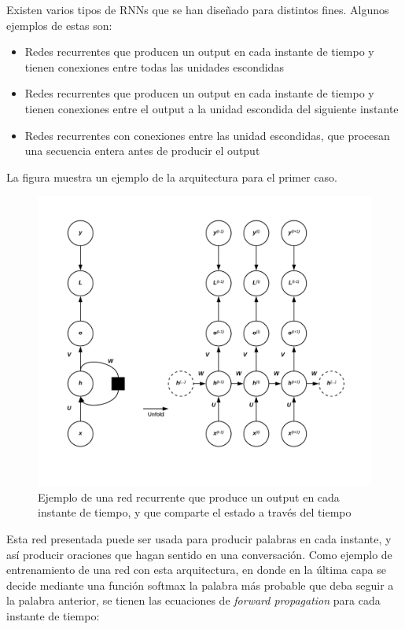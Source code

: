 Existen varios tipos de RNNs que se han dise{\~{n}}ado para distintos fines. Algunos ejemplos de estas son:

\begin{itemize}
  \item Redes recurrentes que producen un output en cada instante de tiempo y tienen conexiones entre todas las unidades escondidas
  \item Redes recurrentes que producen un output en cada instante de tiempo y tienen conexiones entre el output a la unidad escondida del siguiente instante
  \item Redes recurrentes con conexiones entre las unidad escondidas, que procesan una secuencia entera antes de producir el output
\end{itemize}

La figura muestra un ejemplo de la arquitectura para el primer caso.

\begin{figure}[H]
\captionsetup{font=small,labelfont=small}
\caption{Ejemplo de una red recurrente que produce un output en cada instante de tiempo, y que comparte el estado a trav\'es del tiempo}
\centering
\includegraphics[scale=.5]{img/cap7_RNN2.png}
\end{figure}

Esta red presentada puede ser usada para producir palabras en cada instante, y as\'i producir oraciones que hagan sentido en una conversaci\'on. Como ejemplo de entrenamiento de una red con esta arquitectura, en donde en la \'ultima capa se decide mediante una funci\'on softmax la palabra m\'as probable que deba seguir a la palabra anterior, se tienen las ecuaciones de \textit{forward propagation} para cada instante de tiempo:

